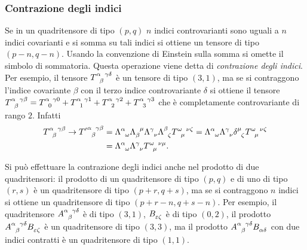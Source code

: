 \subsubsection{Contrazione degli indici}
\label{sec:contrazione-indice}

Se in un quadritensore di tipo $(p,q)$ $n$ indici controvarianti sono uguali a
$n$ indici covarianti e si somma su tali indici si ottiene un tensore di tipo
$(p-n,q-n)$.  Usando la convenzione di Einstein sulla somma si omette il simbolo
di sommatoria.  Questa operazione viene detta di
\emph{contrazione degli indici}.  Per esempio, il tensore
$\tensor{T}{^{\alpha}_{\beta}^{\gamma\delta}}$ è un tensore di tipo $(3,1)$, ma
se si contraggono l'indice covariante $\beta$ con il terzo indice controvariante
$\delta$ si ottiene il tensore
$\tensor{T}{^{\alpha}_{\beta}^{\gamma\beta}} =
\tensor{T}{^{\alpha}_{0}^{\gamma 0}} + \tensor{T}{^{\alpha}_{1}^{\gamma 1}} +
\tensor{T}{^{\alpha}_{2}^{\gamma 2}} + \tensor{T}{^{\alpha}_{3}^{\gamma 3}}$
che è completamente controvariante di rango $2$.  Infatti
\begin{equation}
  \begin{split}
    \tensor{T}{^{\alpha}_{\beta}^{\gamma\beta}} \to
    \tensor{{T'}}{^{\alpha}_{\beta}^{\gamma\beta}} &=
    \tensor{\Lambda}{^{\alpha}_{\omega}} \tensor{\Lambda}{_{\beta}^{\mu}}
    \tensor{\Lambda}{^{\gamma}_{\nu}} \tensor{\Lambda}{^{\beta}_{\zeta}}
    \tensor{T}{^{\omega}_{\mu}^{\nu\zeta}} =
    \tensor{\Lambda}{^{\alpha}_{\omega}} \tensor{\Lambda}{^{\gamma}_{\nu}}
    \tensor{\delta}{^{\mu}_{\zeta}} \tensor{T}{^{\omega}_{\mu}^{\nu\zeta}} \\
    &= \tensor{\Lambda}{^{\alpha}_{\omega}} \tensor{\Lambda}{^{\gamma}_{\nu}}
    \tensor{T}{^{\omega}_{\mu}^{\nu\mu}}.
  \end{split}
\end{equation}

Si può effettuare la contrazione degli indici anche nel prodotto di due
quadritensori: il prodotto di un quadritensore di tipo $(p,q)$ e di uno di tipo
$(r,s)$ è un quadritensore di tipo $(p+r,q+s)$, ma se si contraggono $n$ indici
si ottiene un quadritensore di tipo $(p+r-n,q+s-n)$.  Per esempio, il
quadritensore $\tensor{A}{^{\alpha}_{\beta}^{\gamma\delta}}$ è di tipo $(3,1)$,
$\tensor{B}{_{\epsilon\zeta}}$ è di tipo $(0,2)$, il prodotto
$\tensor{A}{^{\alpha}_{\beta}^{\gamma\delta}} \tensor{B}{_{\epsilon\zeta}}$ è un
quadritensore di tipo $(3,3)$, ma il prodotto
$\tensor{A}{^{\alpha}_{\beta}^{\gamma\delta}} \tensor{B}{_{\alpha\delta}}$ con
due indici contratti è un quadritensore di tipo $(1,1)$.

